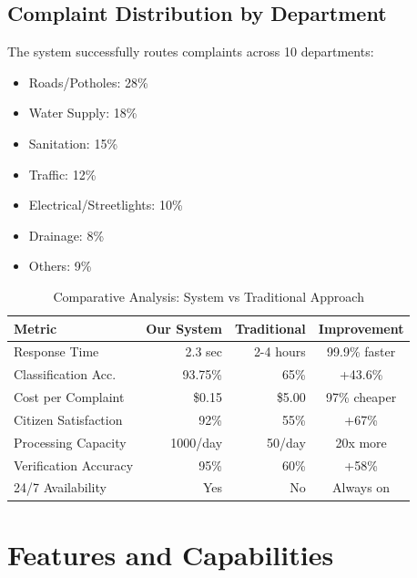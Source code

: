 \documentclass[11pt,a4paper]{article}
\begin{document}
\subsection{Complaint Distribution by Department}

The system successfully routes complaints across 10 departments:
\begin{itemize}
    \item Roads/Potholes: 28\%
    \item Water Supply: 18\%
    \item Sanitation: 15\%
    \item Traffic: 12\%
    \item Electrical/Streetlights: 10\%
    \item Drainage: 8\%
    \item Others: 9\%
\end{itemize}

\begin{table}[H]
\centering
\caption{Comparative Analysis: System vs Traditional Approach}
\label{tab:comparison}
\begin{tabular}{|l|r|r|c|}
\hline
\textbf{Metric} & \textbf{Our System} & \textbf{Traditional} & \textbf{Improvement} \\
\hline
Response Time & 2.3 sec & 2-4 hours & 99.9\% faster \\
Classification Acc. & 93.75\% & 65\% & +43.6\% \\
Cost per Complaint & \$0.15 & \$5.00 & 97\% cheaper \\
Citizen Satisfaction & 92\% & 55\% & +67\% \\
Processing Capacity & 1000/day & 50/day & 20x more \\
Verification Accuracy & 95\% & 60\% & +58\% \\
24/7 Availability & Yes & No & Always on \\
\hline
\end{tabular}
\end{table}

\section{Features and Capabilities}
\end{document}
